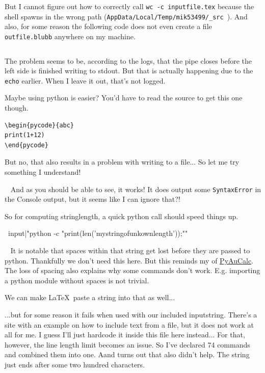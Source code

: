 \documentclass{article} \usepackage[utf8]{inputenc}
\makeatletter
\newenvironment{pycode}[1]%
{\xdef\d@tn@me{#1}\xdef\r@ncmd{python #1.py > #1.plog}%
\typeout{Writing file #1}\VerbatimOut{#1.py}%
}
{\endVerbatimOut %
\toks0{\immediate\write18}%
\expandafter\toks\expandafter1\expandafter{\r@ncmd}%
 \edef\d@r@ncmd{\the\toks0{\the\toks1}}\d@r@ncmd %
 \noindent Input
 \inputminted{python}{\d@tn@me.py}%
 \noindent Output
 \inputminted{text}{\d@tn@me.plog}%
 }
\newcommand{\code}[1]{\colorbox{codebggray}{{\texttt{#1}}}}
\makeatother
\begin{document}
But I cannot figure out how to correctly call \texttt{wc -c inputfile.tex} because the shell spawns in the wrong path (\code{AppData/Local/Temp/mik53499/\_src }). And also, for some reason the following code does not even create a file \texttt{outfile.blubb} anywhere on my machine.
\begin{lstlisting}

\end{lstlisting}
The problem seems to be, according to the logs, that the pipe closes before the left side is finished writing to stdout. But that is actually happening due to the \texttt{echo} earlier. When I leave it out, that's not logged.

Maybe using python is easier? You'd have to read the source to get this one though.
\begin{lstlisting}
\begin{pycode}{abc}
print(1+12)
\end{pycode}
\end{lstlisting}
But no, that also results in a problem with writing to a file... So let me try something I understand!
\begin{mycode}

\end{mycode}

~\newline
And as you should be able to see, it works!
It does output some \code{SyntaxError} in the Console output, but it seems like I can ignore that?!

So for computing stringlength, a quick python call should speed things up.
\begin{mycode}
\ input{|"python -c "print(len('mystringofunkownlength'));""}
\end{mycode}

~\newline
It is notable that spaces within that string get lost before they are passed to python. Thankfully we don't need this here. But this reminds my of \href{https://ctftime.org/writeup/21982}{PyAuCalc}.
The loss of spacing also explains why some commands don't work. E.g. importing a python module without spaces is not trivial.

We can make \LaTeX\, paste a string into that as well...

\begin{mycode}
\def\mystr{hello}
\def\mystrtwo{\mystr}

\end{mycode}
\def\mystr{hello}
\def\mystrtwo{\mystr}

...but for some reason it fails when used with our included inputstring. There's a site with an example on how to include text from a file, but it does not work at all for me. I guess I'll just hardcode it inside this file here instead... For that, however, the line length limit becomes an issue. So I've declared 74 commands and combined them into one. Aand turns out that also didn't help. The string just ends after some two hundred characters.
\end{document}
